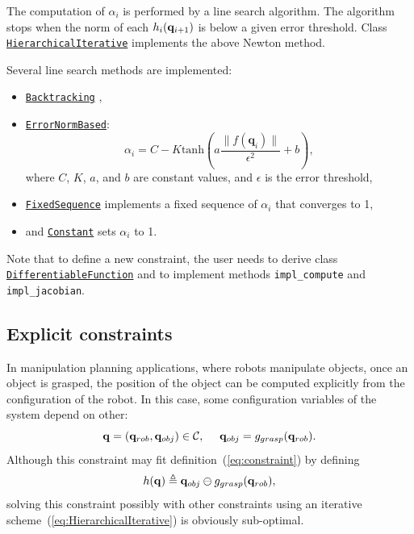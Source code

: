 The computation of $\alpha_i$ is performed by a line search algorithm.
The algorithm stops when the norm of each $h_i(\mathbf{q}_{i+1})$ is below a given error threshold.
Class\\ \href{https://gepettoweb.laas.fr/hpp/hpp-constraints/doxygen-html/classhpp_1_1constraints_1_1solver_1_1HierarchicalIterative.html}{\texttt{HierarchicalIterative}} implements the above Newton method.
{\color{blue}
Several line search methods are implemented:
\begin{itemize}
\item \href{https://gepettoweb.laas.fr/hpp/hpp-constraints/doxygen-html/structhpp_1_1constraints_1_1solver_1_1lineSearch_1_1Backtracking.html}{\texttt{Backtracking}} \cite{backtracking},
\item \href{https://gepettoweb.laas.fr/hpp/hpp-constraints/doxygen-html/structhpp_1_1constraints_1_1solver_1_1lineSearch_1_1ErrorNormBased.html}{\texttt{ErrorNormBased}}:
  $$\alpha_{i} = C - K  \text{tanh}(a \frac{\|f(\mathbf{q}_i)\|}{\epsilon^2} + b),$$
  where $C$, $K$, $a$, and $b$ are constant values, and $\epsilon$ is the
  error threshold,
\item \href{https://gepettoweb.laas.fr/hpp/hpp-constraints/doxygen-html/structhpp_1_1constraints_1_1solver_1_1lineSearch_1_1FixedSequence.html}{\texttt{FixedSequence}} implements a fixed sequence of $\alpha_i$ that converges to 1,
\item and \href{https://gepettoweb.laas.fr/hpp/hpp-constraints/doxygen-html/structhpp_1_1constraints_1_1solver_1_1lineSearch_1_1Constant.html}{\texttt{Constant}} sets $\alpha_i$ to 1.
\end{itemize}
}
Note that to define a new constraint, the user needs to derive class \href{https://gepettoweb.laas.fr/hpp/hpp-constraints/doxygen-html/classhpp_1_1constraints_1_1DifferentiableFunction.html}{\texttt{DifferentiableFunction}} and to implement methods \texttt{impl\_compute} and \texttt{impl\_jacobian}.

\subsection{Explicit constraints}

In manipulation planning applications, where robots manipulate objects, once an object is grasped, the position of the object can be computed explicitly from the configuration of the robot. In this case, some configuration variables of the system depend on other:
$$
\conf=(\conf_{rob},\conf_{obj})\in\CS,\ \ \ \ \conf_{obj} = g_{grasp}(\conf_{rob}).
$$
Although this constraint may fit definition~(\ref{eq:constraint}) by defining
\begin{equation}\label{eq:explicit-grasp}
h(\conf) \triangleq \conf_{obj} \ominus g_{grasp}(\conf_{rob}),
\end{equation}
solving this constraint possibly with other constraints using an iterative scheme~(\ref{eq:HierarchicalIterative}) is obviously sub-optimal.

